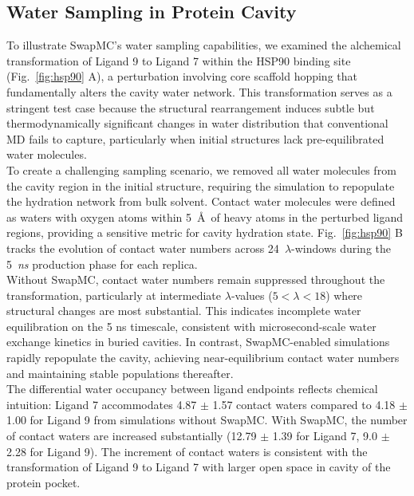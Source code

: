 \documentclass[journal=jacsat,manuscript=article]{achemso}
\begin{document}
\subsection{Water Sampling in Protein Cavity}
To illustrate SwapMC's water sampling capabilities, we examined the alchemical transformation of Ligand 9 to Ligand 7 within the HSP90 binding site (Fig.~\ref{fig:hsp90} A), 
a perturbation involving core scaffold hopping that fundamentally alters the cavity water network. 
This transformation serves as a stringent test case because the structural rearrangement induces subtle but thermodynamically significant changes in water distribution that conventional MD fails to capture, 
particularly when initial structures lack pre-equilibrated water molecules. \\
\newline
To create a challenging sampling scenario, we removed all water molecules from the cavity region in the initial structure, 
requiring the simulation to repopulate the hydration network from bulk solvent. 
Contact water molecules were defined as waters with oxygen atoms within 5~\AA~of heavy atoms in the perturbed ligand regions, 
providing a sensitive metric for cavity hydration state. 
Fig.~\ref{fig:hsp90} B tracks the evolution of contact water numbers across 24~$\lambda$-windows during the 5~\textit{ns} production phase for each replica. \\
\newline
Without SwapMC, contact water numbers remain suppressed throughout the transformation, 
particularly at intermediate $\lambda$-values ($5 < \lambda < 18$) where structural changes are most substantial. 
This indicates incomplete water equilibration on the 5 ns timescale, consistent with microsecond-scale water exchange kinetics in buried cavities. %
In contrast, SwapMC-enabled simulations rapidly repopulate the cavity, 
achieving near-equilibrium contact water numbers and maintaining stable populations thereafter. \\
\newline
The differential water occupancy between ligand endpoints reflects chemical intuition: 
Ligand 7 accommodates 4.87 $\pm$ 1.57 contact waters compared to 4.18 $\pm$ 1.00 for Ligand 9 from simulations without SwapMC.
With SwapMC, the number of contact waters are increased substantially (12.79 $\pm$ 1.39 for Ligand 7, 9.0 $\pm$ 2.28 for Ligand 9). 
The increment of contact waters is consistent with the transformation of Ligand 9 to Ligand 7 with larger open space in cavity of the protein pocket. 
\end{document}
